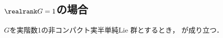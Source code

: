 \subsection{$\realrank G = 1$の場合}

\begin{thm}\label{thm:1216-main}
  $G$を実階数1の非コンパクト実半単純Lie 群とするとき， が成り立つ．
\end{thm}


\begin{lem}
  
\end{lem}